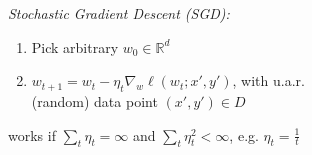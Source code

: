 \emph{Stochastic Gradient Descent (SGD):}

\begin{highlightbox}
\begin{enumerate}
    \item Pick arbitrary $w_0 \in \mathbb{R}^d$
	\item $w_{t+1} = w_t - \eta_t \nabla_w \ell(w_t;x',y')$, with u.a.r.\\ (random) data point $(x',y') \in D$
\end{enumerate}
\end{highlightbox}

works if $\sum\limits_t \eta_t=\infty$ and $\sum\limits_t \eta_t^2 < \infty$,
e.g. $\eta_t \!=\! \frac{1}{t}$
